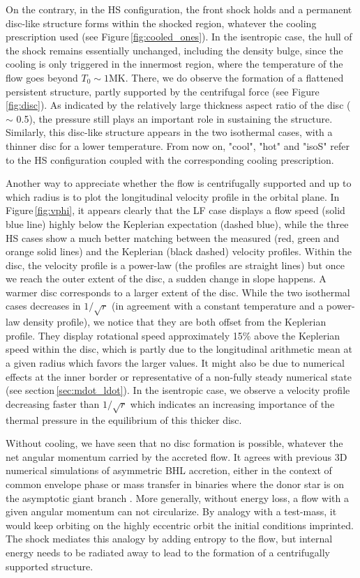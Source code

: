 \documentclass{aa}
\begin{document}
On the contrary, in the HS configuration, the front shock holds and a permanent disc-like structure forms within the shocked region, whatever the cooling prescription used (see Figure\,\ref{fig:cooled_ones}). In the isentropic case, the hull of the shock remains essentially unchanged, including the density bulge, since the cooling is only triggered in the innermost region, where the temperature of the flow goes beyond $T_0\sim 1$MK. There, we do observe the formation of a flattened persistent structure, partly supported by the centrifugal force (see Figure\,\ref{fig:disc}). As indicated by the relatively large thickness aspect ratio of the disc ($\sim$ 0.5), the pressure still plays an important role in sustaining the structure. Similarly, this disc-like structure appears in the two isothermal cases, with a thinner disc for a lower temperature. From now on, "cool", "hot" and "isoS" refer to the HS configuration coupled with the corresponding cooling prescription.

Another way to appreciate whether the flow is centrifugally supported and up to which radius is to plot the longitudinal velocity profile in the orbital plane. In Figure\,\ref{fig:vphi}, it appears clearly that the LF case displays a flow speed (solid blue line) highly below the Keplerian expectation (dashed blue), while the three HS cases show a much better matching between the measured (red, green and orange solid lines) and the Keplerian (black dashed) velocity profiles. Within the disc, the velocity profile is a power-law (the profiles are straight lines) but once we reach the outer extent of the disc, a sudden change in slope happens. A warmer disc corresponds to a larger extent of the disc. While the two isothermal cases decreases in $1/\sqrt{r}$ (in agreement with a constant temperature and a power-law density profile), we notice that they are both offset from the Keplerian profile. They display rotational speed approximately 15\% above the Keplerian speed within the disc, which is partly due to the longitudinal arithmetic mean at a given radius which favors the larger values. It might also be due to numerical effects at the inner border or representative of a non-fully steady numerical state (see section\,\ref{sec:mdot_ldot}). In the isentropic case, we observe a velocity profile decreasing faster than $1/\sqrt{r}$ which indicates an increasing importance of the thermal pressure in the equilibrium of this thicker disc.

Without cooling, we have seen that no disc formation is possible, whatever the net angular momentum carried by the accreted flow. It agrees with previous 3D numerical simulations of asymmetric BHL accretion, either in the context of common envelope phase \citep{MacLeod2014} or mass transfer in binaries where the donor star is on the asymptotic giant branch \citep{Saladino2018}. More generally, without energy loss, a flow with a given angular momentum can not circularize. By analogy with a test-mass, it would keep orbiting on the highly eccentric orbit the initial conditions imprinted. The shock mediates this analogy by adding entropy to the flow, but internal energy needs to be radiated away to lead to the formation of a centrifugally supported structure.
\end{document}
